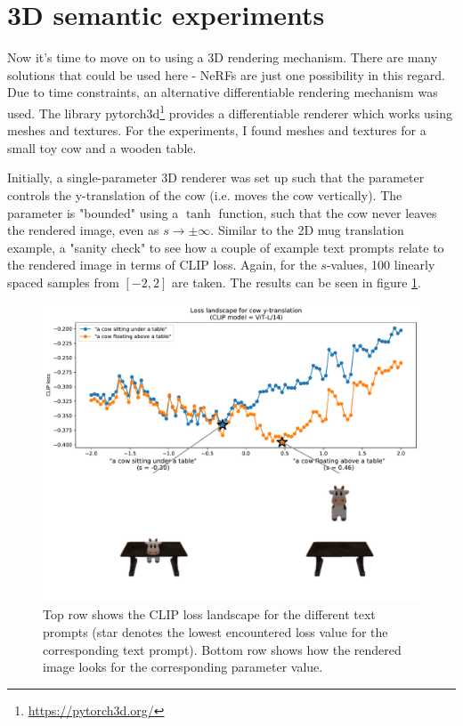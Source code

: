 \section{3D semantic experiments}
Now it's time to move on to using a 3D rendering mechanism. There are many solutions that could be used here - NeRFs are just one possibility in this regard. Due to time constraints, an alternative differentiable rendering mechanism was used. The library pytorch3d\footnote{\url{https://pytorch3d.org/}} provides a differentiable renderer which works using meshes and textures. For the experiments, I found meshes and textures for a small toy cow and a wooden table.

Initially, a single-parameter 3D renderer was set up such that the parameter controls the y-translation of the cow (i.e. moves the cow vertically). The parameter is "bounded" using a $\tanh$ function, such that the cow never leaves the rendered image, even as $s \rightarrow \pm \infty$. Similar to the 2D mug translation example, a "sanity check" to see how a couple of example text prompts relate to the rendered image in terms of CLIP loss. Again, for the $s$-values, 100 linearly spaced samples from $[-2,2]$ are taken. The results can be seen in figure \ref{fig:3_3-cow-translation-optimal-images}.
\begin{figure}[H]
    \centering
    \includegraphics[width=1.0\textwidth]{figures/3_3-cow-translation-optimal-images.pdf}
    \caption{Top row shows the CLIP loss landscape for the different text prompts (star denotes the lowest encountered loss value for the corresponding text prompt). Bottom row shows how the rendered image looks for the corresponding parameter value.}
    \label{fig:3_3-cow-translation-optimal-images}
\end{figure}

